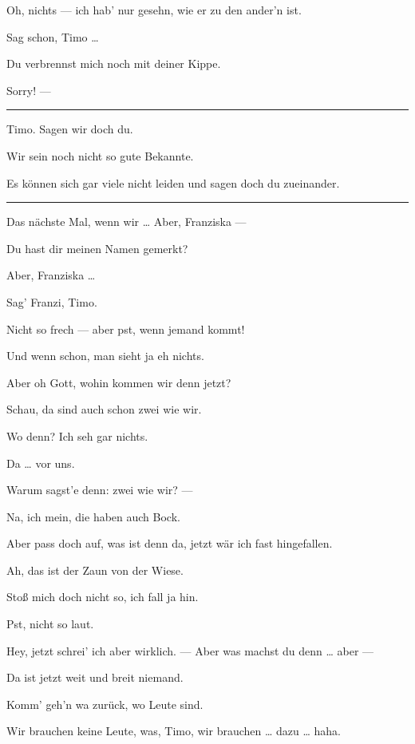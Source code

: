 \documentclass[
	final,
	a4paper,
	ngerman,
	mpinclude = true, %
	twoside = true,
	open = right,
	cleardoublepage = plain,
	DIV = 13,
	BCOR = 1cm,
	titlepage = firstiscover,
	]{scrbook}
\newenvironment{deletion}{%
		\vspace{0.25\baselineskip}
		\hrule
		\vspace{0.25\baselineskip}
		\color{darkgray}
	}{
		\color{black}
		\vspace{0.25\baselineskip}
		\hrule 
		\vspace{0.25\baselineskip}
	}
\newcommand{\thecharacter}[1]{\textup{\textsc{#1}}\xspace}
\newcommand{\thesoldatin}{\thecharacter{Franziska}}
\newcommand{\thepraktikant}{\thecharacter{Timo}}
\newcommand{\character}[1]{\item[#1:]}
\newcommand{\soldatin}{\character{\thesoldatin}}
\newcommand{\praktikant}{\character{\thepraktikant}}
\begin{document}
\begin{play}
	\praktikant
	Oh, nichts --- ich hab' nur gesehn, wie er zu den ander'n ist.

	\soldatin
	Sag schon, Timo \ldots{}

	\praktikant
	Du verbrennst mich noch mit deiner Kippe.

	\soldatin
	Sorry! ---
	\begin{deletion}
	Timo. Sagen wir doch du.

	\praktikant
	Wir sein noch nicht so gute Bekannte.

	\soldatin
	Es können sich gar viele nicht leiden und sagen doch du zueinander.
	\end{deletion}

	\praktikant
	Das nächste Mal, wenn wir \ldots{} Aber, Franziska ---

	\soldatin
	Du hast dir meinen Namen gemerkt?

	\praktikant
	Aber, Franziska \ldots{}

	\soldatin
	Sag' Franzi, Timo.

	\praktikant
	Nicht so frech --- aber pst, wenn jemand kommt!

	\soldatin
	Und wenn schon, man sieht ja eh nichts.

	\praktikant
	Aber oh Gott, wohin kommen wir denn jetzt?

	\soldatin
	Schau, da sind auch schon zwei wie wir.

	\praktikant
	Wo denn? Ich seh gar nichts.

	\soldatin
	Da \ldots{} vor uns.

	\praktikant
	Warum sagst'e denn: zwei wie wir? ---

	\soldatin
	Na, ich mein, die haben auch Bock.

	\praktikant
	Aber pass doch auf, was ist denn da, jetzt wär ich fast hingefallen.

	\soldatin
	Ah, das ist der Zaun von der Wiese.

	\praktikant
	Stoß mich doch nicht so, ich fall ja hin.

	\soldatin
	Pst, nicht so laut.

	\praktikant
	Hey, jetzt schrei' ich aber wirklich. --- Aber was machst du denn \ldots{} aber ---

	\soldatin
	Da ist jetzt weit und breit niemand.

	\praktikant
	Komm' geh'n wa zurück, wo Leute sind.

	\soldatin
	Wir brauchen keine Leute, was, Timo, wir brauchen \ldots{} dazu \ldots{} haha.


\end{play}
\end{document}

